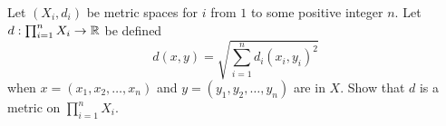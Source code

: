\begin{comment}

\ExerciseSolution We will show that $d$ is a metric on $X \times Y$. Let $x = (x_1,y_1)$ and $y = (x_2,y_2)$ be in $X \times Y$. First note that 
\[d(x,y) = d_X(x_1,x_2) + d_Y(y_1,y_2) \geq 0 + 0 = 0\]
Also
\[d(x,y) = d_X(x_1,x_2) + d_Y(y_1,y_2) = d_X(x_2,x_1) + d_Y(y_2,y_1) = d(y,z).\]

Suppose $x = y$. Then $x_1=x_2$ and $y_1 = y_2$, so 
\[d(x,y) = d_X(x_1,x_2) + d_Y(y_1,y_2) = 0 + 0 = 0.\]
Conversely, suppose that $d(x,y) = 0$. Then $d_X(x_1,x_2) + d_Y(y_1,y_2) = 0$. But both $d_X(x_1,x_2)$ and $d_Y(y_1,y_2)$ are non-negative, which implies that $d_X(x_1,x_2 = 0 = d_Y(y_1,y_2)$. So $x_1=x_2$ and $y_1=y_2$, or $x = y$. 

Finally, let $z = (x_3,y_3) \in X \times Y$. Then 
\begin{align*}
d(x,z) &= d_X(x_1,x_3) + d_Y(y_1,y_3) \\
	&\leq (d_X(x_1,x_2) + d_X(x_2,x_3)) + (d_Y(y_1,y_2) + d_Y(y_2,y_3)) \\
	&= (d_X(x_1,x_2)+d_Y(y_1,y_2)) + (d_X(x_2,x_3) + d_Y(y_2,y_3)) \\
	&= d(x,y) + d(y,z).
\end{align*}

\end{comment}


\item \label{ex:prod_metric} Let $(X_i, d_i)$ be metric spaces for $i$ from $1$ to some positive integer $n$. Let $d: \prod_{i=1}^n X_i \to \mathbb{R}$ be defined 
\[d(x,y) = \sqrt{\sum_{i=1}^n d_i(x_i,y_i)^2}\]
when $x = (x_1, x_2, \ldots, x_n)$ and $y = (y_1, y_2, \ldots, y_n)$ are in $X$. Show that $d$ is a metric on $\prod_{i=1}^n X_i$.

